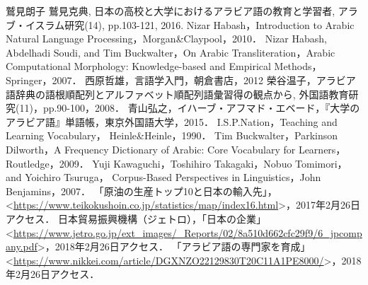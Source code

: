 \documentclass[technicalreport]{ieicej}
\begin{document}
\begin{thebibliography}{99}
鷲見朗子 鷲見克典, 日本の高校と大学におけるアラビア語の教育と学習者, アラブ・イスラム研究(14), pp.103-121, 2016.
Nizar Habash，Introduction to Arabic Natural Language Processing，Morgan\&Claypool，2010．
Nizar Habash, Abdelhadi Soudi, and Tim Buckwalter，On Arabic Transliteration，Arabic Computational Morphology: Knowledge-based and Empirical Methods，Springer，2007．
西原哲雄，言語学入門，朝倉書店，2012
榮谷温子，アラビア語辞典の語根順配列とアルファベット順配列語彙習得の観点から, 外国語教育研究(11)，pp.90-100，2008．
青山弘之，イハーブ・アフマド・エベード，『大学のアラビア語』単語帳，東京外国語大学，2015．
I.S.P.Nation，Teaching and Learning Vocabulary， Heinle\&Heinle，1990．
Tim Buckwalter，Parkinson Dilworth，A Frequency Dictionary of Arabic: Core Vocabulary for Learners， Routledge，2009．
Yuji Kawaguchi，Toshihiro Takagaki，Nobuo Tomimori，and Yoichiro Tsuruga，
Corpus-Based Perspectives in Linguistics，John Benjamins，2007．
「原油の生産トップ10と日本の輸入先」， \textless \url{https://www.teikokushoin.co.jp/statistics/map/index16.html}\textgreater，2017年2月26日アクセス．
 日本貿易振興機構（ジェトロ），「日本の企業」\textless \url{https://www.jetro.go.jp/ext_images/_Reports/02/8a510d662cfc29f9/6_jpcompany.pdf}\textgreater，2018年2月26日アクセス．
「アラビア語の専門家を育成」\textless \url{https://www.nikkei.com/article/DGXNZO22129830T20C11A1PE8000/}\textgreater，2018年2月26日アクセス．
\end{thebibliography}
\end{document}
